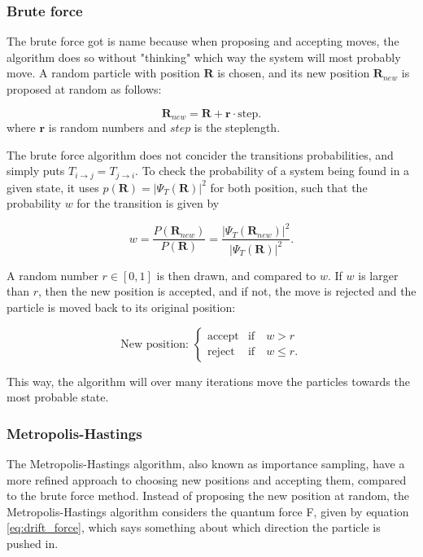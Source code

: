 \documentclass[norsk,a4paper,12pt]{article}
\begin{document}
\subsubsection{Brute force}
The brute force got is name because when proposing and accepting moves, the algorithm does so without "thinking" which way the system will most probably move. A random particle with position $\boldsymbol{R}$ is chosen, and its new position $\boldsymbol{R}_{new}$ is proposed at random as follows:

\begin{equation}
\boldsymbol{R}_{new} = \boldsymbol{R} + \boldsymbol{r}\cdot \text{step}.
\end{equation}
where $\boldsymbol{r}$ is random numbers and $step$ is the steplength.
\par 
\vspace{3mm}
The brute force algorithm does not concider the transitions probabilities, and simply puts $T_{i\rightarrow j} = T_{j\rightarrow i}$. To check the probability of a system being found in a given state, it uses $p(\boldsymbol{R})=|\Psi_T(\boldsymbol{R})|^2$ for both position, such that the probability $w$ for the transition is given by

\begin{equation}
w=\frac{P(\boldsymbol{R}_{new})}{P(\boldsymbol{R})}=\frac{|\Psi_T(\boldsymbol{R}_{new})|^2}{|\Psi_T(\boldsymbol{R})|^2}.
\end{equation}

A random number $r \in [0,1]$ is then drawn, and compared to $w$. If $w$ is larger than $r$, then the new position is accepted, and if not, the move is rejected and the particle is moved back to its original position:

\begin{equation}
\text{New position: }
\begin{cases} 
\text{accept} & \text{if}\quad w > r \\
\text{reject} & \text{if}\quad w \leq r.
\end{cases}
\end{equation}

This way, the algorithm will over many iterations move the particles towards the most probable state.


\subsubsection{Metropolis-Hastings} \label{sec:Metropolis-Hastings}
The Metropolis-Hastings algorithm, also known as importance sampling, have a more refined approach to choosing new positions and accepting them, compared to the brute force method. Instead of proposing the new position at random, the Metropolis-Hastings algorithm considers the quantum force F, given by equation \ref{eq:drift_force}, which says something about which direction the particle is pushed in. 
\end{document}
